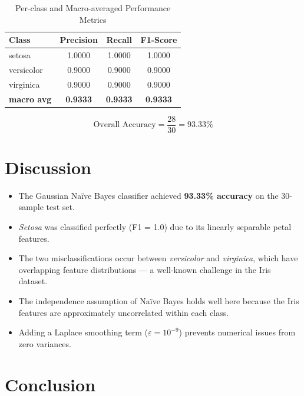 \documentclass[12pt,a4paper]{article}
\begin{document}
\begin{table}[H]
\centering
\caption{Per-class and Macro-averaged Performance Metrics}
\begin{tabular}{l ccc}
\toprule
\textbf{Class} & \textbf{Precision} & \textbf{Recall} & \textbf{F1-Score} \\
\midrule
setosa     & 1.0000 & 1.0000 & 1.0000 \\
versicolor & 0.9000 & 0.9000 & 0.9000 \\
virginica  & 0.9000 & 0.9000 & 0.9000 \\
\midrule
\textbf{macro avg} & \textbf{0.9333} & \textbf{0.9333} & \textbf{0.9333} \\
\bottomrule
\end{tabular}
\end{table}

\begin{equation*}
  \text{Overall Accuracy} = \frac{28}{30} = 93.33\%
\end{equation*}

\section{Discussion}

\begin{itemize}
  \item The Gaussian Na\"{i}ve Bayes classifier achieved \textbf{93.33\% accuracy} on the 30-sample test set.
  \item \textit{Setosa} was classified perfectly (F1 = 1.0) due to its linearly separable petal features.
  \item The two misclassifications occur between \textit{versicolor} and \textit{virginica}, which have overlapping feature distributions — a well-known challenge in the Iris dataset.
  \item The independence assumption of Na\"{i}ve Bayes holds well here because the Iris features are approximately uncorrelated within each class.
  \item Adding a Laplace smoothing term ($\varepsilon = 10^{-9}$) prevents numerical issues from zero variances.
\end{itemize}

\section{Conclusion}
\end{document}
